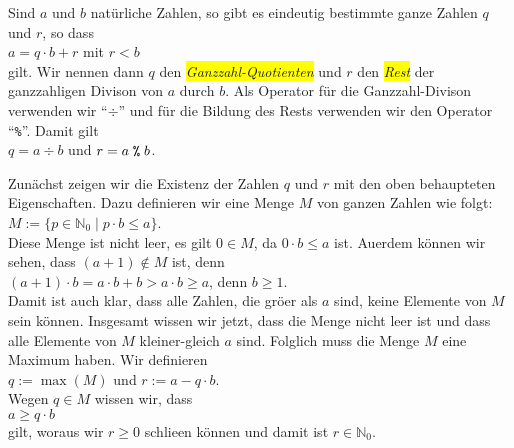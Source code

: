 \begin{Satz}
  \label{satz:division_mit_rest}
  Sind $a$ und $b$ nat\"{u}rliche Zahlen, so gibt es eindeutig bestimmte ganze Zahlen 
  $q$ und $r$, so dass 
  \\[0.2cm]
  \hspace*{1.3cm}
  $a = q \cdot b + r$ \quad mit $r < b$
  \\[0.2cm]
  gilt.  Wir nennen dann $q$ den \colorbox{yellow}{\emph{Ganzzahl-Quotienten}} und $r$ den \colorbox{yellow}{\emph{Rest}} der ganzzahligen
  Divison von $a$ durch $b$.  Als Operator f\"{u}r die Ganzzahl-Divison verwenden wir ``$\div$''
  und f\"{u}r die Bildung des Rests verwenden wir den Operator ``\texttt{\%}''.
  Damit gilt 
  \\[0.2cm]
  \hspace*{1.3cm}
  $q = a \div b$ \quad und \quad $r = a \;\texttt{\%}\; b$.
\end{Satz}  

\proof
Zun\"{a}chst zeigen wir die Existenz der Zahlen $q$ und $r$ mit den oben behaupteten Eigenschaften.
Dazu definieren wir eine Menge $M$ von ganzen Zahlen wie folgt:
\\[0.2cm]
\hspace*{1.3cm}
$M := \{ p \in \mathbb{N}_0 \mid p \cdot b \leq a \}$.
\\[0.2cm]
Diese Menge ist nicht leer, es gilt $0 \in M$, da $0 \cdot b \leq a$ ist.
Au\3erdem k\"{o}nnen wir sehen, dass $(a+1) \not\in M$ ist, denn
\\[0.2cm]
\hspace*{1.3cm}
$(a+1) \cdot b = a \cdot b + b > a \cdot b \geq a$, \quad denn $b \geq 1$.
\\[0.2cm]
Damit ist auch klar, dass alle Zahlen, die gr\"{o}\3er als $a$ sind, keine Elemente
von $M$ sein k\"{o}nnen.  Insgesamt wissen wir jetzt, dass die Menge nicht leer ist und dass alle
Elemente von $M$ kleiner-gleich $a$ sind.  Folglich muss die Menge $M$ eine Maximum haben.
Wir definieren
\\[0.2cm]
\hspace*{1.3cm}
$q := \max(M)$ \quad und \quad $r := a - q \cdot b$.
\\[0.2cm]
Wegen $q \in M$ wissen wir, dass
\\[0.2cm]
\hspace*{1.3cm}
$a \geq q \cdot b$
\\[0.2cm]
gilt, woraus wir $r \geq 0$ schlie\3en k\"{o}nnen und damit ist $r \in \mathbb{N}_0$.


